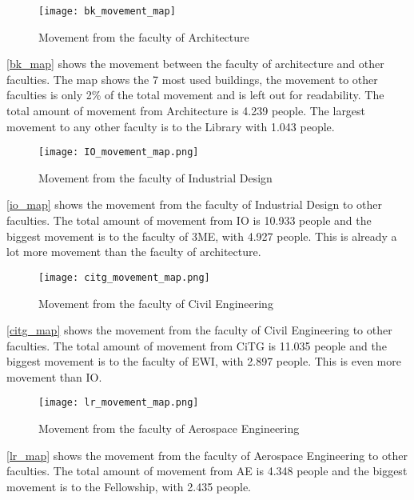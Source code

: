 \begin{figure}[H]
\centering
\texttt{[image: bk\_movement\_map]}
\captionsetup{justification=centering}
\caption{Movement from the faculty of Architecture}
\label{bk_map}
\end{figure} 

\autoref{bk_map} shows the movement between the faculty of architecture and other faculties. The map shows the 7 most used buildings, the movement to other faculties is only 2\% of the total movement and is left out for readability. The total amount of movement from Architecture is 4.239 people. The largest movement to any other faculty is to the Library with 1.043 people. \\

\begin{figure}[H]
\centering
\texttt{[image: IO\_movement\_map.png]}
\captionsetup{justification=centering}
\caption{Movement from the faculty of Industrial Design}
\label{io_map}
\end{figure} 

\autoref{io_map} shows the movement from the faculty of Industrial Design to other faculties. The total amount of movement from IO is 10.933 people and the biggest movement is to the faculty of 3ME, with 4.927 people. This is already a lot more movement than the faculty of architecture.\\

\begin{figure}[H]
\centering
\texttt{[image: citg\_movement\_map.png]}
\captionsetup{justification=centering}
\caption{Movement from the faculty of Civil Engineering}
\label{citg_map}
\end{figure} 

\autoref{citg_map} shows the movement from the faculty of Civil Engineering to other faculties. The total amount of movement from CiTG is 11.035 people and the biggest movement is to the faculty of EWI, with 2.897 people. This is even more movement than IO.\\

\begin{figure}[H]
\centering
\texttt{[image: lr\_movement\_map.png]}
\captionsetup{justification=centering}
\caption{Movement from the faculty of Aerospace Engineering}
\label{lr_map}
\end{figure} 

\autoref{lr_map} shows the movement from the faculty of Aerospace Engineering to other faculties. The total amount of movement from AE is 4.348 people and the biggest movement is to the Fellowship, with 2.435 people. 

